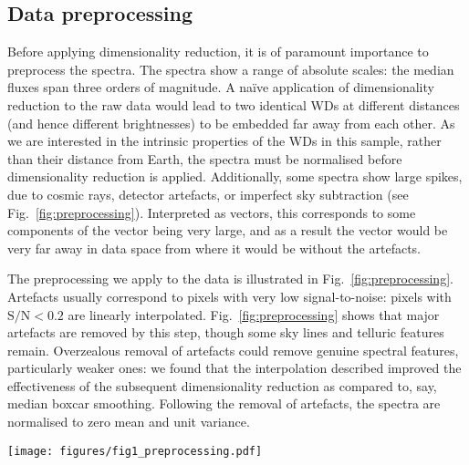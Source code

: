 \documentclass[fleqn,usenatbib]{mnras}
\begin{document}
\subsection{Data preprocessing}
\label{sec:preprocessing}

Before applying dimensionality reduction, it is of paramount importance to preprocess the spectra.
The spectra show a range of absolute scales: the median fluxes span three orders of magnitude.
A na\"{i}ve application of dimensionality reduction to the raw data would lead to two identical WDs at different distances (and hence different brightnesses) to be embedded far away from each other.
As we are interested in the intrinsic properties of the WDs in this sample, rather than their distance from Earth, the spectra must be normalised before dimensionality reduction is applied.
Additionally, some spectra show large spikes, due to cosmic rays, detector artefacts, or imperfect sky subtraction (see Fig.~\ref{fig:preprocessing}).
Interpreted as vectors, this corresponds to some components of the vector being very large, and as a result the vector would be very far away in data space from where it would be without the artefacts.

The preprocessing we apply to the data is illustrated in Fig.~\ref{fig:preprocessing}.
Artefacts usually correspond to pixels with very low signal-to-noise: pixels with $\mathrm{S}/\mathrm{N}<0.2$ are linearly interpolated.
Fig.~\ref{fig:preprocessing} shows that major artefacts are removed by this step, though some sky lines and telluric features remain.
Overzealous removal of artefacts could remove genuine spectral features, particularly weaker ones: we found that the interpolation described improved the effectiveness of the subsequent dimensionality reduction as compared to, say, median boxcar smoothing.
Following the removal of artefacts, the spectra are normalised to zero mean and unit variance.

\begin{figure*}
\centering
\texttt{[image: figures/fig1\_preprocessing.pdf]}
\caption{
    Preprocessing stages, as illustrated on the cherry-picked DESI EDR spectrum of WDJ170114.72+760207.16.
    The upper panel shows the raw spectrum, with several artefacts.
    The second panel shows that the signal-to-noise ratio is very low near many of these artefacts; where it falls below 0.2, the pixels are interpolated.
    The spectra are then rescaled to zero mean and unit variance, as shown in the lower panel.
    Major artefacts have been removed, though certain imperfect sky subtraction and telluric features remain, particularly above $7500\,\text{\AA}$.
}
\label{fig:preprocessing}
\end{figure*}
\end{document}
